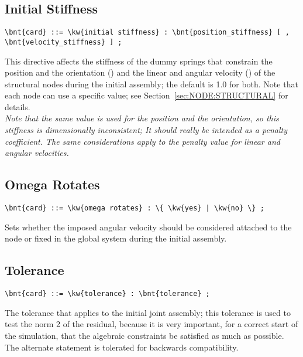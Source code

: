\subsection{Initial Stiffness}\label{sec:CONTROLDATA:INITIALSTIFFNESS}
\begin{Verbatim}[commandchars=\\\{\}]
    \bnt{card} ::= \kw{initial stiffness} : \bnt{position_stiffness} [ , \bnt{velocity_stiffness} ] ;
\end{Verbatim}
This directive affects the stiffness of the dummy springs that constrain
the position and the orientation ()
and the linear and angular velocity ()
of the structural nodes during the initial assembly; the default is 1.0 for both.
Note that each node can use a specific value; 
see Section~\ref{sec:NODE:STRUCTURAL} for details. \\
\emph{Note that the same value is used for the position and the orientation,
so this stiffness is dimensionally inconsistent; It should really 
be intended as a penalty coefficient.
The same considerations apply to the penalty value for linear 
and angular velocities.}

\subsection{Omega Rotates}
\begin{Verbatim}[commandchars=\\\{\}]
    \bnt{card} ::= \kw{omega rotates} : \{ \kw{yes} | \kw{no} \} ;
\end{Verbatim}
Sets whether the imposed angular velocity should be considered attached 
to the node or fixed in the global system during the initial assembly.

\subsection{Tolerance}
\begin{Verbatim}[commandchars=\\\{\}]
    \bnt{card} ::= \kw{tolerance} : \bnt{tolerance} ;
\end{Verbatim}
The tolerance that applies to the initial joint assembly; 
this tolerance is used to test the norm 2 of the residual,
because it is very important, for a correct start of the simulation,
that the algebraic constraints be satisfied as much as possible.
The alternate statement  is tolerated 
for backwards compatibility.

